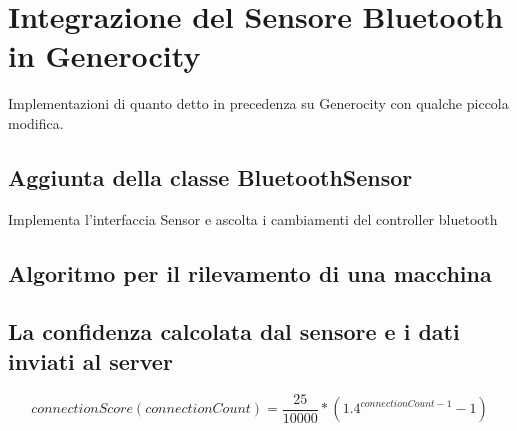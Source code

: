 \chapter{Integrazione del Sensore Bluetooth in Generocity}
Implementazioni di quanto detto in precedenza su Generocity con qualche piccola modifica.

\section{Aggiunta della classe BluetoothSensor}
Implementa l'interfaccia Sensor e ascolta i cambiamenti del controller bluetooth

\section{Algoritmo per il rilevamento di una macchina}

\section{La confidenza calcolata dal sensore e i dati inviati al server}
\[connectionScore(connectionCount) = \frac{25}{10000} * (1.4^{connectionCount-1} - 1)\]